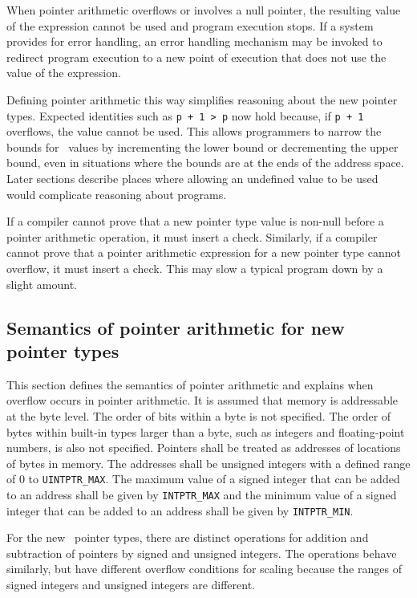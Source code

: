 When pointer arithmetic overflows or involves a null pointer, the
resulting value of the expression cannot be used and program execution
stops. If a system provides for error handling, an error handling
mechanism may be invoked to redirect program execution to a new point of
execution that does not use the value of the expression.

Defining pointer arithmetic this way simplifies reasoning about the new
pointer types. Expected identities such as \texttt{p + 1 > p} now hold
because, if \texttt{p + 1} overflows, the value cannot be
used. This allows programmers to narrow the bounds for
\arrayptr\ values by incrementing the lower bound or
decrementing the upper bound, even in situations where the bounds are at
the ends of the address space. Later sections describe places where
allowing an undefined value to be used would complicate reasoning about
programs.

If a compiler cannot prove that a new pointer type value is non-null
before a pointer arithmetic operation, it must insert a check.
Similarly, if a compiler cannot prove that a pointer arithmetic
expression for a new pointer type cannot overflow, it must insert a
check. This may slow a typical program down by a slight amount.

\subsection{Semantics of pointer arithmetic for new pointer types}
\label{section:new-pointer-types-semantics}

This section defines the semantics of pointer arithmetic and explains
when overflow occurs in pointer arithmetic. It is assumed that memory is
addressable at the byte level. The order of bits within a byte is not
specified. The order of bytes within built-in types larger than a byte,
such as integers and floating-point numbers, is also not specified.
Pointers shall be treated as addresses of locations of bytes in memory.
The addresses shall be unsigned integers with a defined range of 0 to
\texttt{UINTPTR\_MAX}. The maximum value of a signed integer that can be
added to an address shall be given by \texttt{INTPTR\_MAX} and the
minimum value of a signed integer that can be added to an address shall
be given by \texttt{INTPTR\_MIN}.

For the new
\arrayptrT\ pointer
types, there are distinct operations for addition and subtraction of
pointers by signed and unsigned integers. The operations behave
similarly, but have different overflow conditions for scaling because
the ranges of signed integers and unsigned integers are different.

